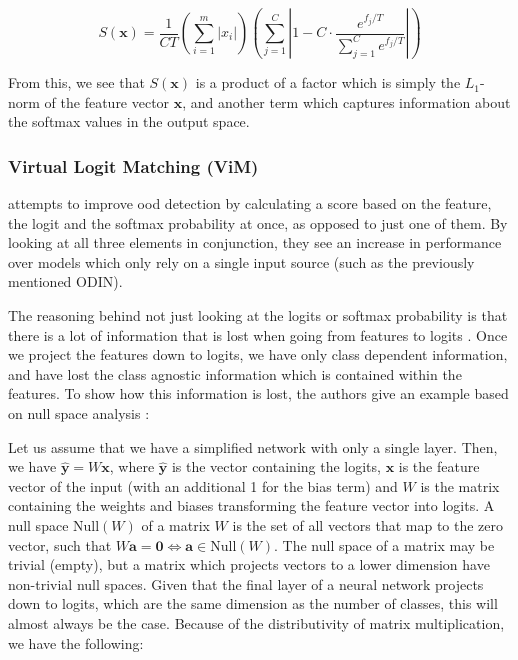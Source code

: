 \documentclass[UKenglish]{uiomasterthesis} %
\theoremstyle{definition}
\begin{document}
\begin{equation}
S(\bm{x}) = \frac{1}{CT}  \left(\sum_{i=1}^m |x_i|\right) \left(\sum_{j=1}^C \left|1 - C \cdot \frac{e^{f_j / T}}{\sum_{j=1}^C e^{{f_{j}} / T}}\right|\right)
\label{eq:decomp}
\end{equation}

From this, we see that $S(\bm{x})$ is a product of a factor which is simply the $L_1$-norm of the feature vector $\bm{x}$, and another term which captures information about the softmax values in the output space.
\\


\subsubsection{Virtual Logit Matching (ViM)} \label{section:vim}

\cite{vim} attempts to improve \ac{ood} detection by calculating a score based on the feature, the logit and the softmax probability at once, as opposed to just one of them. By looking at all three elements in conjunction, they see an increase in performance over models which only rely on a single input source (such as the previously mentioned ODIN).

The reasoning behind not just looking at the logits or softmax probability is that there is a lot of information that is lost when going from features to logits \cite{vim}. Once we project the features down to logits, we have only class dependent information, and have lost the class agnostic information which is contained within the features. To show how this information is lost, the authors give an example based on null space analysis \cite{nusa}:

Let us assume that we have a simplified network with only a single layer. Then, we have $\hat{\bm{y}} = W \bm{x}$, where $\hat{\bm{y}}$ is the vector containing the logits, $\bm{x}$ is the feature vector of the input (with an additional 1 for the bias term) and $W$ is the matrix containing the weights and biases transforming the feature vector into logits. A null space $\text{Null}(W)$ of a matrix $W$ is the set of all vectors that map to the zero vector, such that $W \bm{a} = \bm{0} \iff \bm{a} \in \text{Null}(W)$. The null space of a matrix may be trivial (empty), but a matrix which projects vectors to a lower dimension have non-trivial null spaces. Given that the final layer of a neural network projects down to logits, which are the same dimension as the number of classes, this will almost always be the case. Because of the distributivity of matrix multiplication, we have the following:
\end{document}

